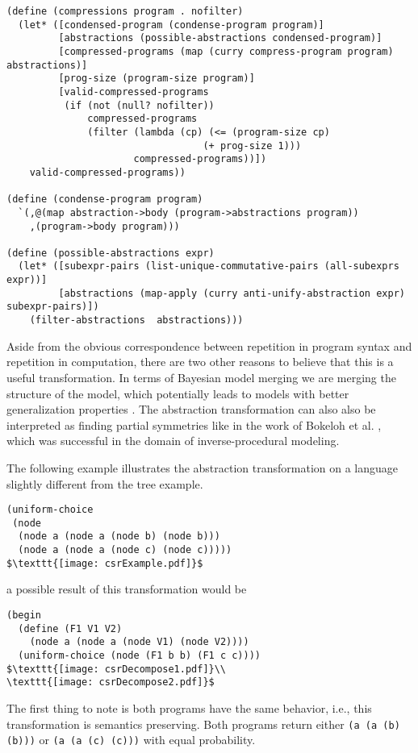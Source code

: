 \documentclass[a4paper,10pt]{article}
\begin{document}
\begin{lstlisting}[frame=trbl]
(define (compressions program . nofilter)
  (let* ([condensed-program (condense-program program)]
         [abstractions (possible-abstractions condensed-program)]
         [compressed-programs (map (curry compress-program program) abstractions)]
         [prog-size (program-size program)]
         [valid-compressed-programs
          (if (not (null? nofilter))
              compressed-programs
              (filter (lambda (cp) (<= (program-size cp)
                                  (+ prog-size 1)))
                      compressed-programs))])
    valid-compressed-programs))

(define (condense-program program)
  `(,@(map abstraction->body (program->abstractions program))
    ,(program->body program)))

(define (possible-abstractions expr)
  (let* ([subexpr-pairs (list-unique-commutative-pairs (all-subexprs expr))]
         [abstractions (map-apply (curry anti-unify-abstraction expr) subexpr-pairs)])
    (filter-abstractions  abstractions)))
\end{lstlisting}

Aside from the obvious correspondence between repetition in program syntax and repetition in computation, there are two other reasons to believe that this is a useful transformation. In terms of Bayesian model merging we are merging the structure of the model, which potentially leads to models with better generalization properties \cite{Stolcke:1994:IPG:645515.658235}. The abstraction transformation can also also be interpreted as finding partial symmetries like in the work of Bokeloh et al. \cite{DBLP:journals/tog/BokelohWS10}, which was successful in the domain of inverse-procedural modeling.

The following example illustrates the abstraction transformation on a language slightly different from the tree example.
\begin{lstlisting}[mathescape=true]
(uniform-choice 
 (node
  (node a (node a (node b) (node b)))
  (node a (node a (node c) (node c)))))
$\texttt{[image: csrExample.pdf]}$
\end{lstlisting}
a possible result of this transformation would be
\begin{lstlisting}[mathescape=true]
(begin
  (define (F1 V1 V2)
    (node a (node a (node V1) (node V2))))
  (uniform-choice (node (F1 b b) (F1 c c))))
$\texttt{[image: csrDecompose1.pdf]}\\
\texttt{[image: csrDecompose2.pdf]}$
\end{lstlisting}
The first thing to note is both programs have the same behavior, i.e., this transformation is semantics preserving.  Both programs return either \texttt{(a (a (b) (b)))} or \texttt{(a (a (c) (c)))} with equal probability.
\end{document}

